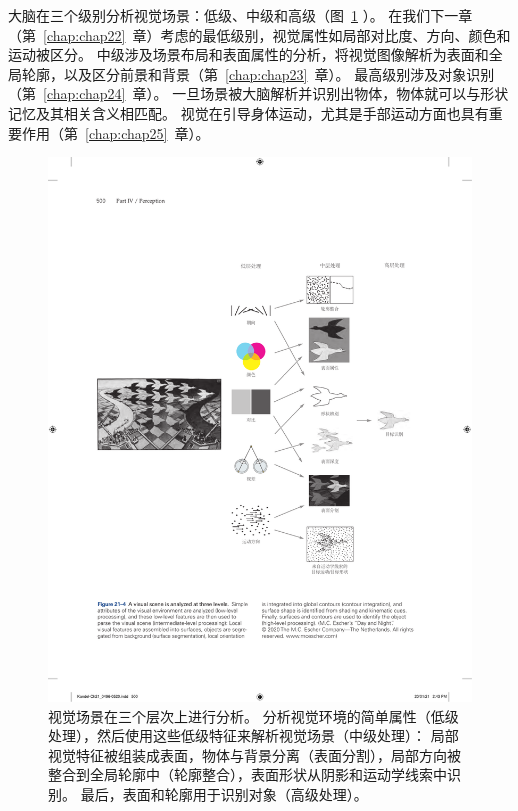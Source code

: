 大脑在三个级别分析视觉场景：低级、中级和高级（图~\ref{fig:21_4} ）。
在我们下一章（第~\ref{chap:chap22}~章）考虑的最低级别，视觉属性如局部对比度、方向、颜色和运动被区分。
中级涉及场景布局和表面属性的分析，将视觉图像解析为表面和全局轮廓，以及区分前景和背景（第~\ref{chap:chap23}~章）。
最高级别涉及对象识别（第~\ref{chap:chap24}~章）。
一旦场景被大脑解析并识别出物体，物体就可以与形状记忆及其相关含义相匹配。
视觉在引导身体运动，尤其是手部运动方面也具有重要作用（第~\ref{chap:chap25}~章）。


\begin{figure}[htbp]
	\centering
	\includegraphics[width=1.0\linewidth]{chap21/fig_21_4}
	\caption{视觉场景在三个层次上进行分析。
		分析视觉环境的简单属性（低级处理），然后使用这些低级特征来解析视觉场景（中级处理）：
		局部视觉特征被组装成表面，物体与背景分离（表面分割），局部方向被整合到全局轮廓中（轮廓整合），表面形状从阴影和运动学线索中识别。
		最后，表面和轮廓用于识别对象（高级处理）。}
	\label{fig:21_4}
\end{figure}


